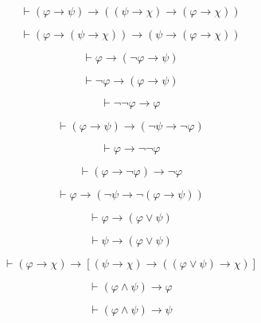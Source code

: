 \documentclass{minimal}
\begin{document}
\begin{equation}
  \vdash(\varphi\to\psi)\to((\psi\to\chi)\to(\varphi\to\chi))
\end{equation}

\begin{equation}
  \vdash(\varphi\to(\psi\to\chi))\to(\psi\to(\varphi\to\chi))
\end{equation}

\begin{equation}
  \vdash\varphi\to(\neg\varphi\to\psi)
\end{equation}

\begin{equation}
  \vdash\neg\varphi\to(\varphi\to\psi)
\end{equation}

\begin{equation}
  \vdash\neg\neg\varphi\to\varphi
\end{equation}

\begin{equation}
  \vdash(\varphi\to\psi)\to(\neg\psi\to\neg\varphi)
\end{equation}

\begin{equation}
  \vdash\varphi\to\neg\neg\varphi
\end{equation}

\begin{equation}
  \vdash(\varphi\to\neg\varphi)\to\neg\varphi
\end{equation}

\begin{equation}
  \vdash\varphi\to(\neg\psi\to\neg(\varphi\to\psi))
\end{equation}

\begin{equation}
  \vdash\varphi\to(\varphi\vee\psi)
\end{equation}

\begin{equation}
  \vdash\psi\to(\varphi\vee\psi)
\end{equation}

\begin{equation}
  \vdash(\varphi\to\chi)\to[(\psi\to\chi)\to((\varphi\vee\psi)\to\chi)]
\end{equation}

\begin{equation}
  \vdash(\varphi\wedge\psi)\to\varphi
\end{equation}

\begin{equation}
  \vdash(\varphi\wedge\psi)\to\psi
\end{equation}
\end{document}
